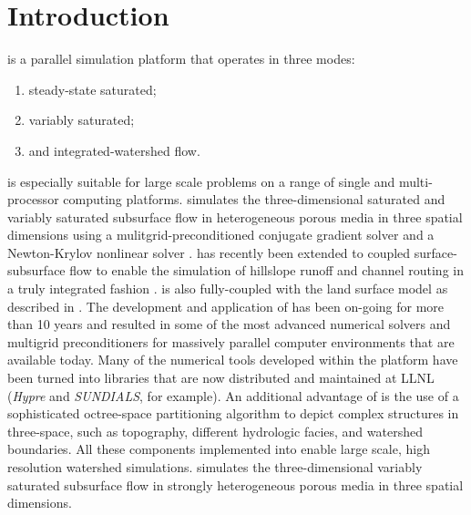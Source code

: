 
\chapter{Introduction}
\label{Introduction}

\parflow{} \cite{Ashby-Falgout90, Jones-Woodward01, KM06} is a parallel simulation platform that operates in three modes:\begin{enumerate}
\item
steady-state saturated; 
\item
variably saturated; 
\item
and integrated-watershed flow.
\end{enumerate}
\parflow{} is especially suitable for large scale problems on a range of single and multi-processor computing platforms. \parflow{} simulates the three-dimensional saturated and variably saturated subsurface flow in heterogeneous porous media in three spatial dimensions using a mulitgrid-preconditioned conjugate gradient solver \cite{Ashby-Falgout90} and a Newton-Krylov nonlinear solver \cite{Jones-Woodward01}. \parflow{} has recently been extended to coupled surface-subsurface flow to enable the simulation of hillslope runoff and channel routing in a truly integrated fashion \cite{KM06}. \parflow{} is also fully-coupled with the land surface model  \cite{Dai03} as described in \cite{MM05,KM08a}.  The development and application of \parflow{} has been on-going for more than 10 years \cite{MK08b, KM08b, KM08a, MK08a, MCT08,MCK07,MWH07,  KM06, MM05, TMCZPS05, MWT03, Teal02, WGM02, Jones-Woodward01, MCT00, TCRM99, TBP99, TFSBA98, Ashby-Falgout90} and resulted in some of the most advanced numerical solvers and multigrid preconditioners for massively parallel computer environments that are available today. Many of the numerical tools developed within the \parflow{} platform have been turned into libraries that are now distributed and maintained at LLNL ({\em Hypre} and {\em SUNDIALS}, for example).   An additional advantage of \parflow{} is the use of a sophisticated octree-space partitioning algorithm to depict complex structures in three-space, such as topography, different hydrologic facies, and watershed boundaries. All these components implemented into \parflow{} enable large scale, high resolution watershed simulations. \parflow{} simulates the three-dimensional variably saturated subsurface flow in strongly heterogeneous porous media in three spatial dimensions.

